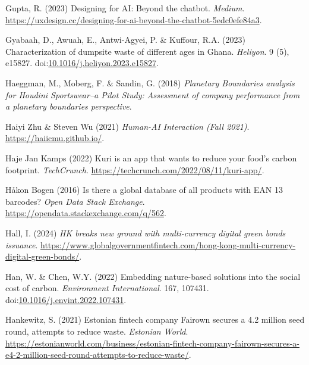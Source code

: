 \documentclass[
  letterpaper,
  DIV=11,
  numbers=noendperiod]{scrartcl}
\newlength{\cslhangindent}
\newenvironment{CSLReferences}[2] %
 {\begin{list}{}{%
  \setlength{\itemindent}{0pt}
  \setlength{\leftmargin}{0pt}
  \setlength{\parsep}{0pt}
  \ifodd #1
   \setlength{\leftmargin}{\cslhangindent}
   \setlength{\itemindent}{-1\cslhangindent}
  \fi
  \setlength{\itemsep}{#2\baselineskip}}}
 {\end{list}}
\begin{document}
\begin{CSLReferences}{0}{1}
Gupta, R. (2023) Designing for {AI}: Beyond the chatbot. \emph{Medium}.
\url{https://uxdesign.cc/designing-for-ai-beyond-the-chatbot-5edc0efe84a3}.

Gyabaah, D., Awuah, E., Antwi-Agyei, P. \& Kuffour, R.A. (2023)
Characterization of dumpsite waste of different ages in {Ghana}.
\emph{Heliyon}. 9 (5), e15827.
doi:\href{https://doi.org/10.1016/j.heliyon.2023.e15827}{10.1016/j.heliyon.2023.e15827}.

Haeggman, M., Moberg, F. \& Sandin, G. (2018) \emph{Planetary
{Boundaries} analysis for {Houdini Sportswear}--a {Pilot Study}:
{Assessment} of company performance from a planetary boundaries
perspective}.

Haiyi Zhu \& Steven Wu (2021) \emph{Human-{AI Interaction} ({Fall}
2021)}. \url{https://haiicmu.github.io/}.

Haje Jan Kamps (2022) Kuri is an app that wants to reduce your food's
carbon footprint. \emph{TechCrunch}.
\url{https://techcrunch.com/2022/08/11/kuri-app/}.

Håkon Bogen (2016) Is there a global database of all products with {EAN}
13 barcodes? \emph{Open Data Stack Exchange}.
\url{https://opendata.stackexchange.com/q/562}.

Hall, I. (2024) \emph{{HK} breaks new ground with multi-currency digital
green bonds issuance}.
\url{https://www.globalgovernmentfintech.com/hong-kong-multi-currency-digital-green-bonds/}.

Han, W. \& Chen, W.Y. (2022) Embedding nature-based solutions into the
social cost of carbon. \emph{Environment International}. 167, 107431.
doi:\href{https://doi.org/10.1016/j.envint.2022.107431}{10.1016/j.envint.2022.107431}.

Hankewitz, S. (2021) Estonian fintech company {Fairown} secures a
{\texteuro}4.2 million seed round, attempts to reduce waste.
\emph{Estonian World}.
\url{https://estonianworld.com/business/estonian-fintech-company-fairown-secures-a-e4-2-million-seed-round-attempts-to-reduce-waste/}.


\end{CSLReferences}
\end{document}
